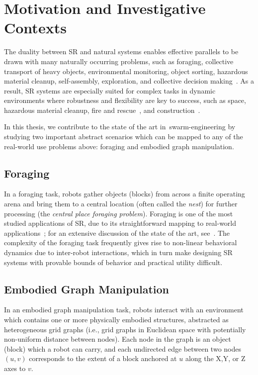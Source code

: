 \section{Motivation and Investigative Contexts}

The duality between SR and natural systems enables effective parallels to
be drawn with many naturally occurring problems, such as foraging, collective
transport of heavy objects, environmental monitoring, object sorting, hazardous
material cleanup, self-assembly, exploration, and collective decision
making~\cite{Hecker2015,Kumar2003,CarrilloZapata2020}.  As a result, SR
systems are especially suited for complex tasks in dynamic environments where
robustness and flexibility are key to success, such as space, hazardous material
cleanup, fire and
rescue~\cite{Rouff2004,CarrilloZapata2020,Sahin2005,Flushing2014}, and
construction~\cite{Petersen2011}.

In this thesis, we contribute to the state of the art in~\gls{swarm-engineering}
by studying two important abstract scenarios which can be mapped to any of the
real-world use problems above: foraging and embodied graph manipulation.

\subsection{Foraging}
%
In a foraging task, robots gather objects (blocks) from across a finite
operating arena and bring them to a central location (often called the
\emph{nest}) for further processing (the \emph{central place foraging
  problem}). Foraging is one of the most studied applications of SR, due to its
straightforward mapping to real-world applications~\cite{Hecker2015}; for an
extensive discussion of the state of the art, see~\cite{Lu2020}.  The
complexity of the foraging task frequently gives rise to non-linear behavioral
dynamics due to inter-robot interactions, which in turn make designing SR
systems with provable bounds of behavior and practical utility difficult.

\subsection{Embodied Graph Manipulation}
%
In an embodied graph manipulation task, robots interact with an environment
which contains one or more physically embodied structures, abstracted as
heterogeneous grid graphs (i.e., grid graphs in Euclidean space with potentially
non-uniform distance between nodes). Each node in the graph is an object (block)
which a robot can carry, and each undirected edge between two nodes $(u,v)$
corresponds to the extent of a block anchored at $u$ along the X,Y, or Z axes to
$v$.

